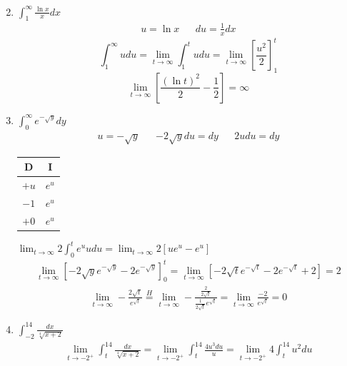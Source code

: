 \documentclass[12pt]{article}
\begin{document}
\begin{enumerate}
\begin{align*}
        \end{align*}\newpage
    \addtocounter{enumi}{3}\item $\int^\infty_1\frac{\ln{x}}{x}dx$
        \begin{align*}
            u = \ln{x} && du = \frac{1}{x}dx
        \end{align*}
        \begin{equation*}
            \int^\infty_1 udu = \lim_{t\to\infty}\int^t_1udu = \lim_{t\to\infty}\left[\frac{u^2}{2}\right]_1^t
        \end{equation*}
        \begin{equation*}
            \lim_{t\to\infty}\left[\frac{(\ln{t})^2}{2}-\frac{1}{2}\right] = \infty
        \end{equation*}
    \addtocounter{enumi}{3}\item $\int^\infty_0e^{-\sqrt{y}}dy$
        \begin{align*}
            u = -\sqrt{y} && -2\sqrt{y}du = dy && 2udu = dy 
        \end{align*}
        \begin{tabular}{c|c}
            D & I \\\hline
            $+u$ & $e^u$\\
            $-1$ & $e^u$\\
            $+0$ & $e^u$
        \end{tabular}
        \quad\quad
        $\lim_{t\to\infty}2\int_0^te^uudu = \lim_{t\to\infty}2\left[u e^u-e^u\right]$\\
        \begin{multline*}
            \lim_{t\to\infty} \left[-2\sqrt{y}e^{-\sqrt{y}}-2e^{-\sqrt{y}}\right]_0^t = \lim_{t\to\infty} \left[-2\sqrt{t}e^{-\sqrt{t}}-2e^{-\sqrt{t}}+2\right] = 2
        \end{multline*}
        \begin{align*}
            \lim_{t\to\infty}-\frac{2\sqrt{t}}{e^{\sqrt{t}}}\overset{H}{=}\lim_{t\to\infty}-\frac{\frac{2}{2\sqrt{t}}}{\frac{1}{2\sqrt{t}}e^{\sqrt{t}}} = \lim_{t\to\infty}\frac{-2}{e^{\sqrt{t}}}=0    
        \end{align*}
    \addtocounter{enumi}{3}\item $\int^{14}_{-2}\frac{dx}{\sqrt[4]{x+2}}$    
        \begin{align*}
            \lim_{t\to -2^+}\int_t^{14}\frac{dx}{\sqrt[4]{x+2}} = \lim_{t\to -2^+}\int_t^{14}\frac{4u^3du}{u}=\lim_{t\to -2^+}4\int_t^{14}u^2du
        \end{align*}
        \begin{align*}

\end{align*}
\end{enumerate}
\end{document}
